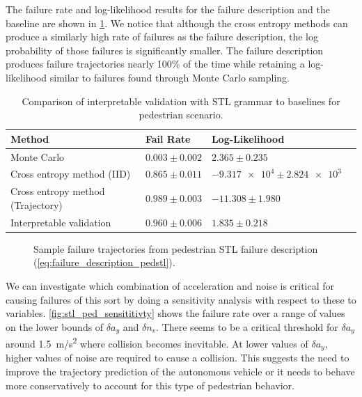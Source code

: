 The failure rate and log-likelihood results for the failure description and the baseline are shown in \cref{tab:ped_results_stl}.  We notice that although the cross entropy methods can produce a similarly high rate of failures as the failure description, the log probability of those failures is significantly smaller. The failure description produces failure trajectories nearly 100\% of the time while retaining a log-likelihood similar to failures found through Monte Carlo sampling. 

\begin{table}
    \centering
    \caption{Comparison of interpretable validation with STL grammar to baselines for pedestrian scenario.}
    \label{tab:ped_results_stl}
    \begin{tabular}{@{}llll@{}} 
        \toprule
        \textbf{Method} & \textbf{Fail Rate} & \textbf{Log-Likelihood} \\
        \midrule
        Monte Carlo & $0.003 \pm 0.002$ & $2.365 \pm 0.235$  \\
        Cross entropy method (IID) & $0.865 \pm 0.011$ & $\num{-9.317e4} \pm \num{2.824e3}$\\
        Cross entropy method (Trajectory) & $0.989 \pm 0.003$ & $-11.308 \pm 1.980$ \\
        Interpretable validation & $0.960 \pm 0.006$ & $1.835 \pm 0.218$ \\
        \bottomrule
    \end{tabular}
\end{table}

\begin{figure}
    
    \caption{Sample failure trajectories from pedestrian STL failure description (\cref{eq:failure_description_pedstl}).}
    \label{fig:ped_stl_sample_failures}
\end{figure}

We can investigate which combination of acceleration and noise is critical for causing failures of this sort by doing a sensitivity analysis with respect to these to variables. \cref{fig:stl_ped_sensititivty} shows the failure rate over a range of values on the lower bounds of $\delta a_y$ and $\delta n_v$. There seems to be a critical threshold for $\delta a_y$ around \SI{1.5}{m/s^2} where collision becomes inevitable. At lower values of $\delta a_y$, higher values of noise are required to cause a collision. This suggests the need to improve the trajectory prediction of the autonomous vehicle or it needs to behave more conservatively to account for this type of pedestrian behavior. 

